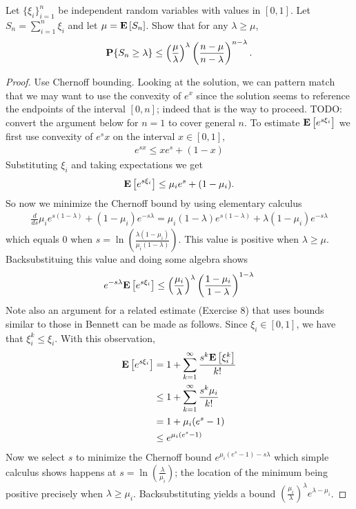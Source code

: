 \begin{lem} Let $\{\xi_i\}_{i=1}^n$ be independent
  random variables with values in $[0,1]$.  Let $S_n = \sum_{i=1}^n
  \xi_i$ and let $\mu=\textbf{E}\left[S_n\right]$.  Show that for any
  $\lambda\geq \mu$,
\begin{align*}
\textbf{P}\{S_n \geq \lambda\} \leq
\left(\frac{\mu}{\lambda}\right)^\lambda \left(\frac{n-\mu}{n-\lambda}\right)^{n-\lambda}.
\end{align*}
\end{lem}
\begin{proof}
Use Chernoff bounding.  Looking at the solution, we can pattern match
that we may want to use the convexity of $e^x$ since the solution
seems to reference the endpoints of the interval $[0,n]$; indeed that
is the way to proceed.  TODO: convert the argument below for $n=1$ to
cover general $n$.
To estimate $\textbf{E}\left[e^{s\xi_i}\right]$ we first use convexity of
$e^sx$ on the interval $x\in[0,1]$,
\begin{align*}
e^{sx} \leq xe^s + (1-x)
\end{align*}
Substituting $\xi_i$ and taking expectations we get
\begin{align*}
\textbf{E}\left[e^{s\xi_i}\right] \leq \mu_i e^s + (1-\mu_i).
\end{align*}
So now we minimize the Chernoff bound by using elementary calculus
\begin{align*}
\frac{d}{ds} \mu_i e^{s(1-\lambda)} + (1-\mu_i)e^{-s\lambda} = \mu_i
(1-\lambda) e^{s(1-\lambda)} + \lambda (1-\mu_i)e^{-s\lambda} 
\end{align*}
which equals $0$ when
$s=\ln\left(\frac{\lambda(1-\mu_i)}{\mu_i(1-\lambda)}\right)$.  This
value is positive when $\lambda \geq \mu$.
Backsubstituing this value and doing some algebra shows
\begin{align*}
e^{-s\lambda}\textbf{E}\left[e^{s\xi_i}\right] \leq
\left(\frac{\mu_i}{\lambda}\right)^\lambda
\left(\frac{1-\mu_i}{1-\lambda}\right)^{1-\lambda}
\end{align*}
Note also an argument for a related estimate (Exercise 8) that uses bounds similar to those in Bennett can be made
as follows.  Since $\xi_i \in [0,1]$, we have that $\xi_i^k \leq
\xi_i$.  With this observation, 
\begin{align*}
\textbf{E}\left[e^{s\xi_i}\right] &= 1 + \sum_{k=1}^\infty \frac{s^k
  \textbf{E}\left[\xi_i^k\right]}{k!} \\
& \leq 1 + \sum_{k=1}^\infty \frac{s^k \mu_i}{k!} \\
&= 1 + \mu_i (e^s -1) \\
&\leq e^{\mu_i(e^s - 1)}
\end{align*}
Now we select $s$ to minimize the Chernoff bound $e^{\mu_i(e^s - 1)
  -s\lambda}$ which simple calculus shows happens at
$s=\ln\left(\frac{\lambda}{\mu_i}\right)$; the location of the minimum
being positive precisely when $\lambda \geq \mu_i$.  Backsubstituting
yields a bound $\left(\frac{\mu_i}{\lambda}\right)^\lambda e^{\lambda
  - \mu_i}$.
\end{proof}
